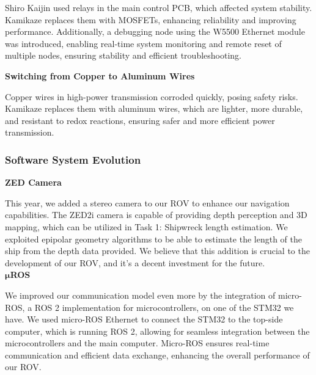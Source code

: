 Shiro Kaijin used relays in the main control PCB, which affected system stability. Kamikaze replaces them with MOSFETs, enhancing reliability and improving performance. Additionally, a debugging node using the W5500 Ethernet module was introduced, enabling real-time system monitoring and remote reset of multiple nodes, ensuring stability and efficient troubleshooting.

\vspace{0.2cm}
\textbf{Switching from Copper to Aluminum Wires}

Copper wires in high-power transmission corroded quickly, posing safety risks. Kamikaze replaces them with aluminum wires, which are lighter, more durable, and resistant to redox reactions, ensuring safer and more efficient power transmission.

\subsubsection{Software System Evolution}

\textbf{ZED Camera}

This year, we added a stereo camera to our ROV to enhance our navigation capabilities. The ZED2i camera is capable of providing depth perception and 3D mapping, which can be utilized in Task 1: Shipwreck length estimation. We exploited epipolar geometry algorithms to be able to estimate the length of the ship from the depth data provided. We believe that this addition is crucial to the development of our ROV, and it's a decent investment for the future. \\

\vspace{0.2cm}
\textbf{$\boldsymbol{\mu}$ROS}

We improved our communication model even more by the integration of micro-ROS, a ROS 2 implementation for microcontrollers, on one of the STM32 we have. We used micro-ROS Ethernet to connect the STM32 to the top-side computer, which is running ROS 2, allowing for seamless integration between the microcontrollers and the main computer. Micro-ROS ensures real-time communication and efficient data exchange, enhancing the overall performance of our ROV.   

